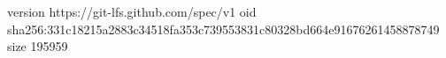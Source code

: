 version https://git-lfs.github.com/spec/v1
oid sha256:331c18215a2883c34518fa353c739553831c80328bd664e91676261458878749
size 195959
